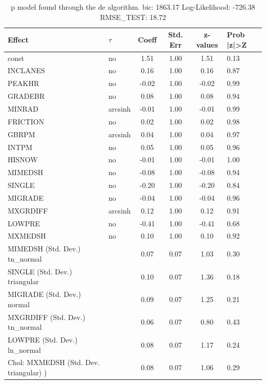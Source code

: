 \begin{table}
	\caption{p model found through the de algorithm. bic: 1863.17 Log-Likelihood: -726.38 RMSE_TEST: 18.72}
	\begin{center}
		\begin{tabular}{|l|l|c|c|c|l|}
			\hline
			Effect & $\tau$ & Coeff & Std. Err & z-values & Prob |z|>Z \\
			\hline
			const & no & 1.51 & 1.00 & 1.51 & 0.13 \\
			\hline
			INCLANES & no & 0.16 & 1.00 & 0.16 & 0.87 \\
			\hline
			PEAKHR & no & -0.02 & 1.00 & -0.02 & 0.99 \\
			\hline
			GRADEBR & no & 0.08 & 1.00 & 0.08 & 0.94 \\
			\hline
			MINRAD & arcsinh & -0.01 & 1.00 & -0.01 & 0.99 \\
			\hline
			FRICTION & no & 0.02 & 1.00 & 0.02 & 0.98 \\
			\hline
			GBRPM & arcsinh & 0.04 & 1.00 & 0.04 & 0.97 \\
			\hline
			INTPM & no & 0.05 & 1.00 & 0.05 & 0.96 \\
			\hline
			HISNOW & no & -0.01 & 1.00 & -0.01 & 1.00 \\
			\hline
			MIMEDSH & no & -0.08 & 1.00 & -0.08 & 0.94 \\
			\hline
			SINGLE & no & -0.20 & 1.00 & -0.20 & 0.84 \\
			\hline
			MIGRADE & no & -0.04 & 1.00 & -0.04 & 0.96 \\
			\hline
			MXGRDIFF & arcsinh & 0.12 & 1.00 & 0.12 & 0.91 \\
			\hline
			LOWPRE & no & -0.41 & 1.00 & -0.41 & 0.68 \\
			\hline
			MXMEDSH & no & 0.10 & 1.00 & 0.10 & 0.92 \\
			\hline
			MIMEDSH (Std. Dev.) tn_normal &  & 0.07 & 0.07 & 1.03 & 0.30 \\
			\hline
			SINGLE (Std. Dev.) triangular &  & 0.10 & 0.07 & 1.36 & 0.18 \\
			\hline
			MIGRADE (Std. Dev.) normal &  & 0.09 & 0.07 & 1.25 & 0.21 \\
			\hline
			MXGRDIFF (Std. Dev.) tn_normal &  & 0.06 & 0.07 & 0.80 & 0.43 \\
			\hline
			LOWPRE (Std. Dev.) ln_normal &  & 0.08 & 0.07 & 1.17 & 0.24 \\
			\hline
			 Chol: MXMEDSH (Std. Dev. triangular) ) &  & 0.08 & 0.07 & 1.06 & 0.29 \\
			\hline
		\end{tabular}
	\end{center}
\end{table}